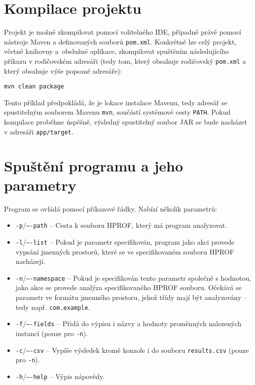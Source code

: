 \section{Kompilace projektu}
Projekt je možné zkompilovat pomocí volitelného IDE, případně právě pomocí nástroje Maven a definovaných souborů \texttt{pom.xml}. Konkrétně lze celý projekt, včetně knihovny a~obslužné aplikace, zkompilovat spuštěním následujícího příkazu v rodičovském adresáři (tedy tom, který obsahuje rodičovský \texttt{pom.xml} a který obsahuje výše popsané adresáře):

\begin{lstlisting}[frame={single}]
mvn clean package
\end{lstlisting}

Tento příklad předpokládá, že je lokace instalace Mavenu, tedy adresář se spustitelným souborem Mavenu \texttt{mvn}, součástí systémové cesty \texttt{PATH}. Pokud kompilace proběhne úspěšně, výsledný spustitelný soubor JAR se bude nacházet v adresáři \texttt{app/target}.

\section{Spuštění programu a jeho parametry}
Program se ovládá pomocí příkazové řádky. Nabízí několik parametrů:

\begin{itemize}
    \item \texttt{-p}/\texttt{----path} -- Cesta k souboru HPROF, který má program analyzovat.
    \item \texttt{-l}/\texttt{----list} -- Pokud je parametr specifikován, program jako akci provede vypsání jmenných prostorů, které se ve specifikovaném souboru HPROF nacházejí.
    \item \texttt{-n}/\texttt{----namespace} -- Pokud je specifikován tento parametr společně s hodnotou, jako akce se provede analýza specifikovaného HPROF souboru. Očekává se parametr ve formátu jmenného prostoru, jehož třídy mají být analyzovány -- tedy např. \texttt{com.\-example}.
    \item \texttt{-f}/\texttt{----fields} -- Přidá do výpisu i názvy a hodnoty proměnných nalezených instancí (pouze pro \texttt{-n}).
    \item \texttt{-c}/\texttt{----csv} -- Vypíše výsledek kromě konzole i do souboru \texttt{results.csv} (pouze pro \texttt{-n}).
    \item \texttt{-h}/\texttt{----help} -- Výpis nápovědy.
\end{itemize}

